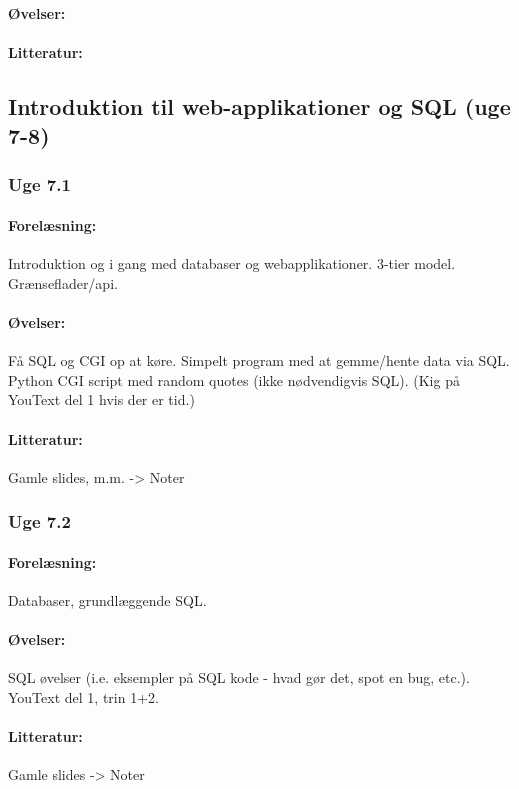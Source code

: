 \documentclass[12pt]{article}
\begin{document}
\paragraph{Øvelser:}

\paragraph{Litteratur:}

\subsection{Introduktion til web-applikationer og SQL (uge 7-8)}
\subsubsection{Uge 7.1}
\paragraph{Forelæsning:} 
Introduktion og i gang med databaser og webapplikationer.
3-tier model. Grænseflader/api.
\paragraph{Øvelser:}
Få SQL og CGI op at køre.
Simpelt program med at gemme/hente data via SQL.
Python CGI script med random quotes (ikke nødvendigvis SQL).
(Kig på YouText del 1 hvis der er tid.)
\paragraph{Litteratur:} Gamle slides, m.m. -> Noter

\subsubsection{Uge 7.2}
\paragraph{Forelæsning:}
Databaser, grundlæggende SQL.
\paragraph{Øvelser:}
SQL øvelser (i.e. eksempler på SQL kode - hvad gør det, spot en bug, etc.).
YouText del 1, trin 1+2.
\paragraph{Litteratur:} Gamle slides -> Noter 
\end{document}

